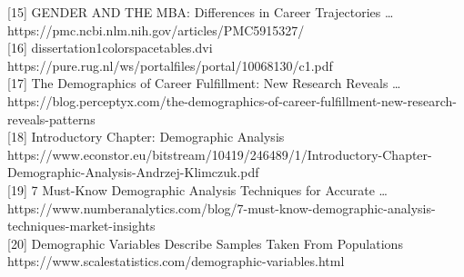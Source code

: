 \documentclass[
  letterpaper,
  DIV=11,
  numbers=noendperiod]{scrartcl}
\begin{document}
{[}15{]} GENDER AND THE MBA: Differences in Career Trajectories \ldots{}
https://pmc.ncbi.nlm.nih.gov/articles/PMC5915327/\\
{[}16{]} dissertation1colorspacetables.dvi
https://pure.rug.nl/ws/portalfiles/portal/10068130/c1.pdf\\
{[}17{]} The Demographics of Career Fulfillment: New Research Reveals
\ldots{}
https://blog.perceptyx.com/the-demographics-of-career-fulfillment-new-research-reveals-patterns\\
{[}18{]} Introductory Chapter: Demographic Analysis
https://www.econstor.eu/bitstream/10419/246489/1/Introductory-Chapter-Demographic-Analysis-Andrzej-Klimczuk.pdf\\
{[}19{]} 7 Must-Know Demographic Analysis Techniques for Accurate
\ldots{}
https://www.numberanalytics.com/blog/7-must-know-demographic-analysis-techniques-market-insights\\
{[}20{]} Demographic Variables Describe Samples Taken From Populations
https://www.scalestatistics.com/demographic-variables.html\\
\end{document}
